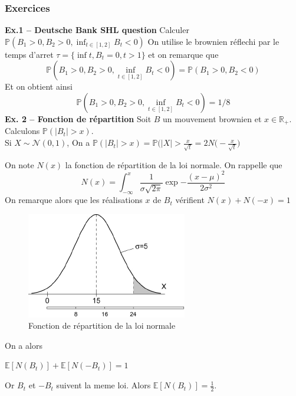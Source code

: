\documentclass[a4paper]{article}
\begin{document}
\subsubsection{Exercices}
\textbf{Ex.1 -- Deutsche Bank SHL question}
Calculer $\mathbb{P}(B_1 > 0, B_2 >0, \inf_{t \in [1,2]} B_t < 0)$
On utilise le brownien réflechi par le temps d'arret $\tau = \{ \inf t, B_t=0, t>1 \}$ et on remarque que 
\begin{equation*}
\mathbb{P}(B_1 > 0, B_2 >0, \inf_{t \in [1,2]} B_t < 0) = \mathbb{P}(B_1 > 0, B_2 <0)
\end{equation*}
Et on obtient ainsi
\begin{equation*}
    \mathbb{P}(B_1 > 0, B_2 >0, \inf_{t \in [1,2]} B_t < 0) = 1/8
\end{equation*}
\textbf{Ex. 2 -- Fonction de répartition} Soit $B$ un mouvement brownien et $x \in \mathbb{R}_+$. Calculons $\mathbb{P}(|B_t|>x)$.
\\
Si $X \sim \mathcal{N}(0,1)$, On a $\mathbb{P}(|B_t|>x)=\mathbb{P}(|X|>\frac{x}{\sqrt{t}}=2N\bigg( - \frac{x}{\sqrt{t}} \bigg)$

On note $N(x)$ la fonction de répartition de la loi normale. On rappelle que 
\begin{equation}
    N(x) = \int_{-\infty}^{x} \frac{1}{\sigma \sqrt{2\pi}}\exp{-\frac{(x-\mu)^2}{2\sigma^2}}
\end{equation}
On remarque alors que les réalisations $x$ de $B_t$ vérifient $N(x)+N(-x)=1$
\begin{figure}[H]
\centering
    \includegraphics[scale=0.6]{figures/loinormale.png}
    \caption{Fonction de répartition de la loi normale}
    \label{fig:my_label}
\end{figure} 
On a alors
\begin{center}
    $\mathbb{E}[N(B_t)]+\mathbb{E}[N(-B_t)]=1$
\end{center}
Or $B_t$ et $-B_t$ suivent la meme loi. Alors $\mathbb{E}[N(B_t)]=\frac{1}{2}$.
\end{document}
